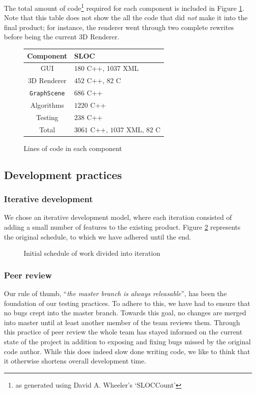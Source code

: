 \documentclass[a4paper,11pt,titlepage]{article}
\newcommand{\code}[1]{\texttt{#1}}
\begin{document}
The total amount of code\footnote{as generated using David
  A. Wheeler's `SLOCCount'} required for each component is included in
Figure \ref{fig:sloc}. Note that this table does not show the all the
code that did \emph{not} make it into the final product; for instance,
the renderer went through two complete rewrites before being the
current 3D Renderer.

\begin{figure}[ht!]
  \centering
  \begin{tabular}{c|l}
    Component         & SLOC \\
    \hline
    GUI               & $180$ C++, 1037 XML\\
    3D Renderer       & $452$ C++, 82 C\\
    \code{GraphScene} & $686$ C++\\
    Algorithms        & $1220$ C++\\
    Testing           & $238$ C++ \\
    \hline
    Total             & $3061$ C++, $1037$ XML, $82$ C
  \end{tabular}
  \caption{Lines of code in each component}
  \label{fig:sloc}
\end{figure}

\subsection{Development practices}
\label{practices}

\subsubsection{Iterative development}

We chose an iterative development model, where each iteration
consisted of adding a small number of features to the existing
product.  Figure \ref{fig:iterations} represents the original
schedule, to which we have adhered until the end.

\begin{figure}[ht!]
  \centering
  
  \caption{Initial schedule of work divided into iteration}
  \label{fig:iterations}
\end{figure}

\subsubsection{Peer review}
Our rule of thumb, ``\emph{the master branch is always releasable}'',
has been
the foundation of our testing practices. To adhere to this, we have
had to ensure that no bugs crept into the master branch. Towards this
goal, no changes are merged into master until at least another member
of the team reviews them. Through this practice of peer review the
whole team has stayed informed on the current state of the project
in addition to exposing and fixing bugs missed by the original code
author. While this does indeed slow done writing code, we like to
think that it otherwise shortens overall development time.
\end{document}
